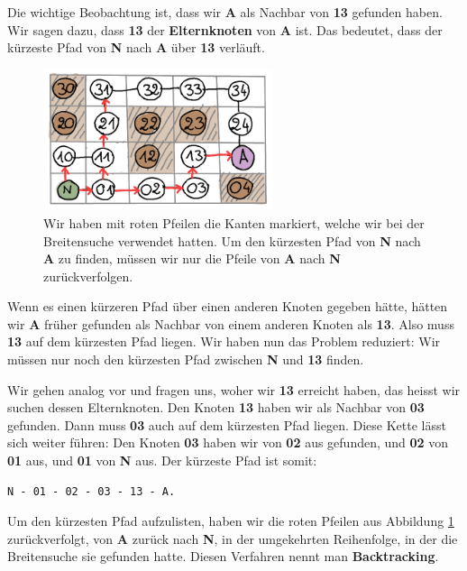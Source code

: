 Die wichtige Beobachtung ist, dass wir \textbf{A} als Nachbar von \textbf{13} gefunden haben. Wir sagen dazu, dass \textbf{13} der \textbf{Elternknoten} von \textbf{A} ist. Das bedeutet, dass der kürzeste Pfad von \textbf{N} nach \textbf{A} über \textbf{13} verläuft.
\begin{figure}[H]
    \centering
    \includegraphics[width=0.6\textwidth]{Pictures/SP/norbert_klein_graph_arrows.png}
    \caption{Wir haben mit roten Pfeilen die Kanten markiert, welche wir bei der Breitensuche verwendet hatten. Um den kürzesten Pfad von \textbf{N} nach \textbf{A} zu finden, müssen wir nur die Pfeile von \textbf{A} nach \textbf{N} zurückverfolgen.}
    \label{fig:norbert_klein_graph_arrows}
\end{figure}
Wenn es einen kürzeren Pfad über einen anderen Knoten gegeben hätte, hätten wir \textbf{A} früher gefunden als Nachbar von einem anderen Knoten als \textbf{13}. Also muss \textbf{13} auf dem kürzesten Pfad liegen. Wir haben nun das Problem reduziert: Wir müssen nur noch den kürzesten Pfad zwischen \textbf{N} und \textbf{13} finden.

Wir gehen analog vor und fragen uns, woher wir \textbf{13} erreicht haben, das heisst wir suchen dessen Elternknoten. Den Knoten \textbf{13} haben wir als Nachbar von \textbf{03} gefunden. Dann muss \textbf{03} auch auf dem kürzesten Pfad liegen. Diese Kette lässt sich weiter führen: Den Knoten \textbf{03} haben wir von \textbf{02} aus gefunden, und \textbf{02} von \textbf{01} aus, und \textbf{01} von \textbf{N} aus. Der kürzeste Pfad ist somit:
\begin{lstlisting}
N - 01 - 02 - 03 - 13 - A.
\end{lstlisting}

Um den kürzesten Pfad aufzulisten, haben wir die roten Pfeilen aus Abbildung \ref{fig:norbert_klein_graph_arrows} zurückverfolgt, von \textbf{A} zurück nach \textbf{N}, in der umgekehrten Reihenfolge, in der die Breitensuche sie gefunden hatte. Diesen Verfahren nennt man \textbf{Backtracking}.

